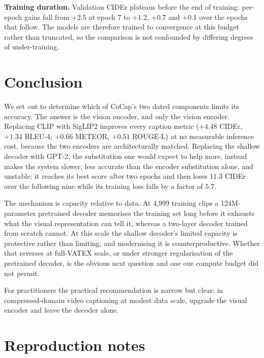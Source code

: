 \documentclass[10pt,twocolumn,letterpaper]{article}
\begin{document}
\textbf{Training duration.} Validation CIDEr plateaus before the end of training:
per-epoch gains fall from $+2.5$ at epoch 7 to $+1.2$, $+0.7$ and $+0.1$ over the epochs that
follow. The models are therefore trained to convergence at this budget rather than
truncated, so the comparison is not confounded by differing degrees of under-training.

\section{Conclusion}
\label{sec:conclusion}

We set out to determine which of CoCap's two dated components limits its accuracy. The answer is
the vision encoder, and only the vision encoder. Replacing CLIP with SigLIP2 improves every
caption metric ($+4.48$ CIDEr, $+1.34$ BLEU-4, $+0.66$ METEOR, $+0.51$ ROUGE-L) at no measurable
inference cost, because the two encoders are architecturally matched. Replacing the shallow
decoder with GPT-2, the substitution one would expect to help more, instead makes the system
slower, less accurate than the encoder substitution alone, and unstable: it reaches its best
score after two epochs and then loses $11.3$ CIDEr over the following nine while its training
loss falls by a factor of $5.7$.

The mechanism is capacity relative to data. At 4,999 training clips a 124M-parameter pretrained
decoder memorises the training set long before it exhausts what the visual representation can
tell it, whereas a two-layer decoder trained from scratch cannot. At this scale the shallow
decoder's limited capacity is protective rather than limiting, and modernising it is
counterproductive. Whether that reverses at full-VATEX scale, or under stronger regularisation of
the pretrained decoder, is the obvious next question and one our compute budget did not permit.

For practitioners the practical recommendation is narrow but clear: in compressed-domain video
captioning at modest data scale, upgrade the visual encoder and leave the decoder alone.

\appendix
\section{Reproduction notes}
\label{sec:repro}
\end{document}
